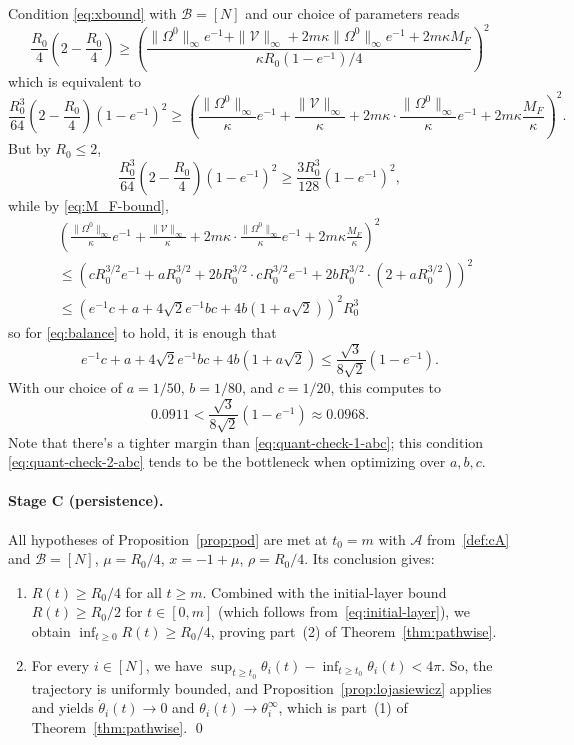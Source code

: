 \documentclass[11pt,reqno]{amsart}
\theoremstyle{definition}
\theoremstyle{remark}
\begin{document}
Condition \eqref{eq:xbound} with $\mathcal{B}=[N]$ and our choice of parameters reads
\begin{equation}\label{eq:balance}
	\frac{R_0}{4}\left(2-\frac{R_0}{4}\right)\ge\left(\frac{\|\Omega^0\|_\infty e^{-1}+\|\mathcal V\|_\infty+2m\kappa\|\Omega^0\|_\infty e^{-1}+2m\kappa M_F}{\kappa R_0(1-e^{-1})/4}\right)^{\!2}
\end{equation}
which is equivalent to
\[
	\frac{R_0^3}{64}\left(2-\frac{R_0}{4}\right)(1-e^{-1})^2\ge\left(\frac{\|\Omega^0\|_\infty}\kappa e^{-1}+\frac{\|\mathcal V\|_\infty}\kappa+2m\kappa\cdot \frac{\|\Omega^0\|_\infty}{\kappa} e^{-1}+2m\kappa \frac{M_F}{\kappa}\right)^{\!2}.
\]
But by $R_0\le 2$,
\[
\frac{R_0^3}{64}\left(2-\frac{R_0}{4}\right)(1-e^{-1})^2\ge \frac{3R_0^3}{128}(1-e^{-1})^2,
\]
while by \eqref{eq:M_F-bound},
\begin{align*}
&\left(\frac{\|\Omega^0\|_\infty}\kappa e^{-1}+\frac{\|\mathcal V\|_\infty}\kappa+2m\kappa\cdot \frac{\|\Omega^0\|_\infty}{\kappa} e^{-1}+2m\kappa \frac{M_F}{\kappa}\right)^{\!2}\\
&\le \left(c R_0^{3/2}e^{-1}+aR_0^{3/2}+2bR_0^{3/2}\cdot cR_0^{3/2}e^{-1}+2bR_0^{3/2}\cdot (2+aR_0^{3/2})\right)^2\\
&\le \left(e^{-1}c+a+4\sqrt{2}e^{-1}bc+4b (1+a\sqrt{2})\right)^2 R_0^3
\end{align*}
so for \eqref{eq:balance} to hold, it is enough that
\begin{equation}\label{eq:quant-check-2-abc}
e^{-1}c+a+4\sqrt{2}e^{-1}bc+4b (1+a\sqrt{2})\le \frac{\sqrt{3}}{8\sqrt{2}}(1-e^{-1}).
\end{equation}
With our choice of $a=1/50$, $b=1/80$, and $c=1/20$, this computes to
\[
0.0911<\frac{\sqrt{3}}{8\sqrt{2}}(1-e^{-1})\approx 0.0968.
\]
Note that there's a tighter margin than \eqref{eq:quant-check-1-abc}; this condition \eqref{eq:quant-check-2-abc} tends to be the bottleneck when optimizing over $a,b,c$.
\paragraph{Stage C (persistence).}


All hypotheses of Proposition~\ref{prop:pod} are
met at $t_0=m$ with $\mathcal A$ from~\eqref{def:cA} and $\mathcal{B}=[N]$,
$\mu=R_0/4$, $x=-1+\mu$, $\rho=R_0/4$. Its conclusion gives:
\begin{enumerate}
\item $R(t)\ge R_0/4$ for all $t\ge m$. Combined with the initial-layer
bound $R(t)\ge R_0/2$ for $t\in[0,m]$ (which follows
from~\eqref{eq:initial-layer}), we obtain $\inf_{t\ge 0}R(t)\ge R_0/4$,
proving part~(2) of Theorem~\ref{thm:pathwise}.
\item For every $i\in[N]$, we have $\sup_{t\ge t_0}\theta_i(t)-\inf_{t\ge t_0}\theta_i(t)<4\pi$. So, the trajectory is uniformly bounded, and
Proposition~\ref{prop:lojasiewicz} applies and yields
$\dot\theta_i(t)\to 0$ and
$\theta_i(t)\to\theta_i^\infty$, which is part~(1) of
Theorem~\ref{thm:pathwise}. \qed
\end{enumerate}
\end{document}
